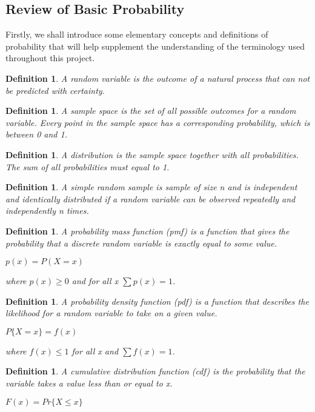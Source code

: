 \documentclass[11pt,a4paper]{article}
\theoremstyle{plain}
\newtheorem{de}[fact]{Definition}
\begin{document}
\subsection*{Review of Basic Probability}
Firstly, we shall introduce some elementary concepts and definitions of probability that will help supplement the understanding of the terminology used throughout this project. 

\begin{de}
A random variable is the outcome of a natural process that can not be predicted with certainty. 
\end{de}

\begin{de}
A sample space is the set of all possible outcomes for a random variable. Every point in the sample space has a corresponding probability, which is between 0 and 1. 
\end{de}

\begin{de}
A distribution is the sample space together with all probabilities. The sum of all probabilities must equal to 1.
\end{de}

\begin{de}
A simple random sample is sample of size n and is independent and identically distributed if a random variable can be observed repeatedly and independently n times.
\end{de}

\begin{de}
A probability mass function (pmf) is a function that gives the probability that a discrete random variable is exactly equal to some value.
\begin{center}
$p(x)=P(X=x)$
\end{center}
where $p(x) \geq 0$ and for all x $\sum p(x)=1$.
\end{de}


\begin{de}
A probability density function (pdf) is a function that describes the likelihood for a random variable to take on a given value.
\begin{center}
$P\{X=x\}=f(x)$
\end{center}
where $f(x)\leq 1$ for all x and $\sum f(x)=1$.
\end{de}

\begin{de}
A cumulative distribution function (cdf) is the probability that the variable takes a value less than or equal to x.
\begin{center}
$F(x)=Pr\{X \leq x\}$ 
\end{center}
\end{de}
\end{document}
